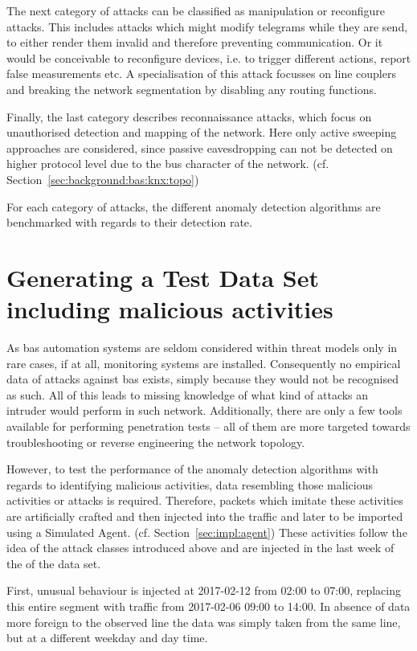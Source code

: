 The next category of attacks can be classified as manipulation or reconfigure attacks. This includes attacks which might modify telegrams while they are send, to either render them invalid and therefore preventing communication. Or it would be conceivable to reconfigure devices, i.e. to trigger different actions, report false measurements etc. A specialisation of this attack focusses on line couplers and breaking the network segmentation by disabling any routing functions.

Finally, the last category describes reconnaissance attacks, which focus on unauthorised detection and mapping of the network. Here only active sweeping approaches are considered, since passive eavesdropping can not be detected on higher protocol level due to the bus character of the network. (cf. Section~\ref{sec:background:bas:knx:topo})

For each category of attacks, the different anomaly detection algorithms are benchmarked with regards to their detection rate.

\section{Generating a Test Data Set including malicious activities}
\label{sec:methods:gen-test}

As \gls{bas} automation systems are seldom considered within threat models only in rare cases, if at all, monitoring systems are installed.
Consequently no empirical data of attacks against \gls{bas} exists, simply because they would not be recognised as such.
All of this leads to missing knowledge of what kind of attacks an intruder would perform in such network.
Additionally, there are only a few tools available for performing penetration tests -- all of them are more targeted towards troubleshooting or reverse engineering the network topology.

However, to test the performance of the anomaly detection algorithms with regards to identifying malicious activities, data resembling those malicious activities or attacks is required.
Therefore, packets which imitate these activities are artificially crafted and then injected into the traffic and later to be imported using a Simulated Agent. (cf. Section~\ref{sec:impl:agent})
These activities follow the idea of the attack classes introduced above and are injected in the last week of the of the data set.

First, unusual behaviour is injected at 2017-02-12 from 02:00 to 07:00, replacing this entire segment with traffic from 2017-02-06 09:00 to 14:00. In absence of data more foreign to the observed line the data was simply taken from the same line, but at a different weekday and day time.


